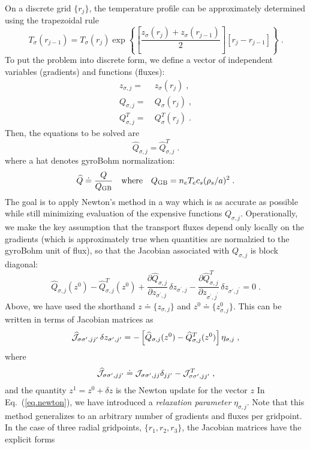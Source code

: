 \documentclass[dvips,12pt]{revtex4}
\newcommand\qgb{Q_{\rm GB}}
\newcommand\qhat{\widehat{Q}}
\newcommand\jhat{\widehat{{\cal J}}}
\newcommand{\sj}{{\sigma,j}}
\newcommand{\sspjjp}{{\sigma\sigma^\prime,jj^\prime}}
\newcommand{\spjp}{{\sigma^\prime,j^\prime}}
\newcommand{\spj}{{\sigma^\prime,j}}
\begin{document}
On a discrete grid $\{r_j\}$, the temperature profile can 
be approximately determined using the trapezoidal rule 
%
\begin{equation}
T_\sigma(r_{j-1}) = T_\sigma(r_j) \exp \left\{
 \left[ \frac{z_\sigma(r_j)+z_\sigma(r_{j-1})}{2} \right]
 \left[ r_j-r_{j-1} \right] \right\} \; .
\end{equation}
%
To put the problem into discrete form, we define a vector of 
independent variables (gradients) and functions (fluxes):
%
\begin{align}
z_\sj = &~ z_\sigma(r_j) \; , \\
Q_\sj = &~ Q_\sigma(r_j) \; , \\
Q^T_\sj = &~ Q^T_\sigma(r_j) \; .
\end{align}
%
Then, the equations to be solved are
%
\begin{equation}
\qhat_\sj = \qhat^T_\sj  \; .
\end{equation}
%
where a hat denotes gyroBohm normalization:
%
\begin{equation}
\qhat \doteq \frac{Q}{\qgb} 
\quad \text{where} \quad \qgb = n_e T_e c_s (\rho_s/a)^2 \; .
\end{equation}
%
The goal is to apply Newton's method in a way which is as accurate 
as possible while still minimizing evaluation of the expensive functions 
$Q_\sj$.  Operationally, we make the key assumption that the transport 
fluxes depend only locally on the gradients (which is approximately 
true when quantities are normalzied to the gyroBohm unit of flux), 
so that the Jacobian associated with $Q_\sj$ is block diagonal:
%
\begin{equation}
\qhat_\sj(z^0) - \qhat^T_\sj(z^0) 
 + \frac{\partial \qhat_\sj}{\partial z_\spj} \,\delta z_\spj 
 - \frac{\partial \qhat^T_\sj}{\partial z_\spjp} \, \delta z_\spjp
 = 0 \; .
\end{equation}
%
Above, we have used the shorthand $z \doteq \{z_\sj\}$ and 
$z^0 \doteq \{z^0_\sj\}$.  This can be written in terms of 
Jacobian matrices as
%
\begin{equation}
\jhat_{\sspjjp} \, \delta z_{\sigma^\prime,j^\prime} = 
 -\left[ \qhat_\sj(z^0) - \qhat^T_\sj(z^0) \right] \eta_\sj \; ,
\label{eq.newton}
\end{equation}
%
where 
%
\begin{equation}
\jhat_\sspjjp \doteq {\cal J}_{\sigma\sigma^\prime,jj} \delta_{jj^\prime}
 -{\cal J}^T_{\sspjjp}\; ,
\end{equation}
%
and the quantity $z^1 = z^0 + \delta z$ is the Newton 
update for the vector $z$  In Eq.~(\ref{eq.newton}), we have
introduced a {\it relaxation parameter} $\eta_\sj$. Note that 
this method generalizes 
to an arbitrary number of gradients and fluxes per gridpoint.  
In the case of three radial gridpoints, $\{r_1,r_2,r_3\}$, 
the Jacobian matrices have the explicit forms
\end{document}
